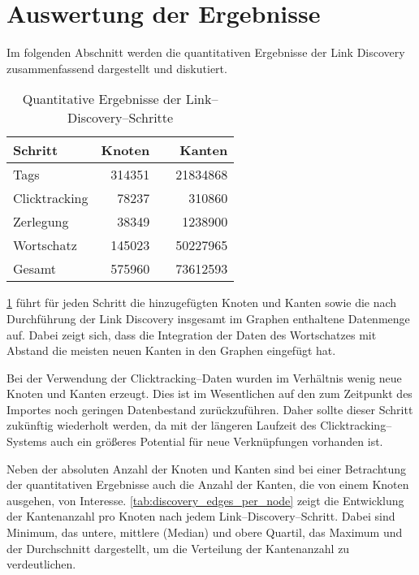 \section{Auswertung der Ergebnisse}

Im folgenden Abschnitt werden die quantitativen Ergebnisse der Link Discovery zusammenfassend dargestellt und diskutiert.

\begin{table}
\centering
\begin{tabular}{lrcr}
    \toprule
    Schritt & Knoten & \phantom{abc} & Kanten \\
    \midrule
    Tags & \num{314351} && \num{21834868} \\
    Clicktracking & \num{78237} && \num{310860} \\
    Zerlegung & \num{38349} && \num{1238900} \\
    Wortschatz & \num{145023} && \num{50227965} \\
    \midrule
    Gesamt & \num{575960} && \num{73612593} \\
    \bottomrule
\end{tabular}
\caption{Quantitative Ergebnisse der Link--Discovery--Schritte}
\label{tab:discovery_amounts}
\end{table}

\cref{tab:discovery_amounts} führt für jeden Schritt die hinzugefügten Knoten und Kanten sowie die nach Durchführung der Link Discovery insgesamt im Graphen enthaltene Datenmenge auf. Dabei zeigt sich, dass die Integration der Daten des Wortschatzes mit Abstand die meisten neuen Kanten in den Graphen eingefügt hat. 

Bei der Verwendung der Clicktracking--Daten wurden im Verhältnis wenig neue Knoten und Kanten erzeugt. Dies ist im Wesentlichen auf den zum Zeitpunkt des Importes noch geringen Datenbestand zurückzuführen. Daher sollte dieser Schritt zukünftig wiederholt werden, da mit der längeren Laufzeit des Clicktracking--Systems auch ein größeres Potential für neue Verknüpfungen vorhanden ist.

Neben der absoluten Anzahl der Knoten und Kanten sind bei einer Betrachtung der quantitativen Ergebnisse auch die Anzahl der Kanten, die von einem Knoten ausgehen, von Interesse. \cref{tab:discovery_edges_per_node} zeigt die Entwicklung der Kantenanzahl pro Knoten nach jedem Link--Discovery--Schritt. Dabei sind Minimum, das untere, mittlere (Median) und obere Quartil, das Maximum und der Durchschnitt dargestellt, um die Verteilung der Kantenanzahl zu verdeutlichen.

